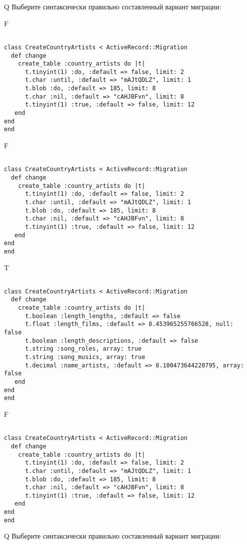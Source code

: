 Q
Выберите синтаксически правильно составленный вариант миграции:

F
\begin{verbatim}
		
class CreateCountryArtists < ActiveRecord::Migration 
  def change 
    create_table :country_artists do |t| 
      t.tinyint(1) :do, :default => false, limit: 2
      t.char :until, :default => "mAJtQDLZ", limit: 1
      t.blob :do, :default => 185, limit: 8
      t.char :nil, :default => "cAHJBFvn", limit: 8
      t.tinyint(1) :true, :default => false, limit: 12
   end
end
end
\end{verbatim}

F
\begin{verbatim}
		
class CreateCountryArtists < ActiveRecord::Migration 
  def change 
    create_table :country_artists do |t| 
      t.tinyint(1) :do, :default => false, limit: 2
      t.char :until, :default => "mAJtQDLZ", limit: 1
      t.blob :do, :default => 185, limit: 8
      t.char :nil, :default => "cAHJBFvn", limit: 8
      t.tinyint(1) :true, :default => false, limit: 12
   end
end
end
\end{verbatim}

T
\begin{verbatim}
		
class CreateCountryArtists < ActiveRecord::Migration 
  def change 
    create_table :country_artists do |t| 
      t.boolean :length_lengths, :default => false
      t.float :length_films, :default => 8.453965255766528, null: false
      t.boolean :length_descriptions, :default => false
      t.string :song_roles, array: true
      t.string :song_musics, array: true
      t.decimal :name_artists, :default => 8.100473644220795, array: false
   end
end
end
\end{verbatim}

F
\begin{verbatim}
		
class CreateCountryArtists < ActiveRecord::Migration 
  def change 
    create_table :country_artists do |t| 
      t.tinyint(1) :do, :default => false, limit: 2
      t.char :until, :default => "mAJtQDLZ", limit: 1
      t.blob :do, :default => 185, limit: 8
      t.char :nil, :default => "cAHJBFvn", limit: 8
      t.tinyint(1) :true, :default => false, limit: 12
   end
end
end
\end{verbatim}

Q
Выберите синтаксически правильно составленный вариант миграции:

